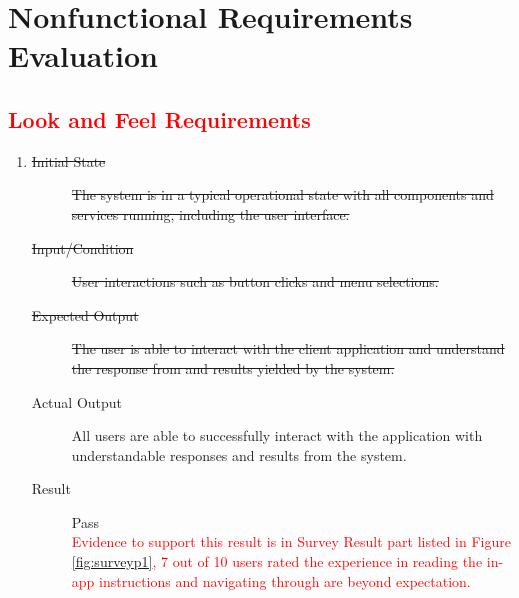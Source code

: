 \documentclass[12pt, titlepage]{article}
\newcommand{\rt}[1]{\textcolor{red}{#1}}
\begin{document}
\section{Nonfunctional Requirements Evaluation}

\rt{\subsection{Look and Feel Requirements}}
\begin{enumerate}[NFR-T1]
\item \label{NFRT1}
  \begin{description}
  \item[\sout{Initial State}] \sout{The system is in a typical operational
      state with all components and services running, including the user
      interface.}
  \item[\sout{Input/Condition}] \sout{User interactions such as button clicks
      and menu selections.}
  \item[\sout{Expected Output}] \sout{The user is able to interact with the
      client application and understand the response from and results
      yielded by the system.}
  \item[Actual Output] All users are able to successfully interact with the
    application with understandable responses and results from the system.
  \item[Result] Pass \\
    \rt{Evidence to support this result is in Survey Result part listed in Figure \ref{fig:surveyp1},
      7 out of 10 users rated the experience in reading the in-app
      instructions and navigating through are beyond expectation.}
  \end{description}
\end{enumerate}
\end{document}
